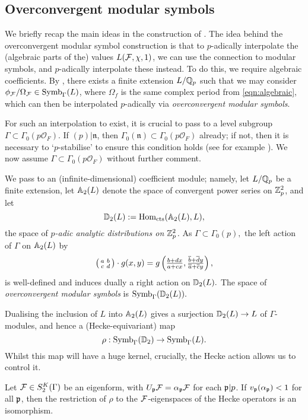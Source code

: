 \documentclass[a4paper,11pt]{article}
\newcommand{\cO}{\mathcal{O}}
\numberwithin{equation}{section}
\newcommand{\fn}{\mathfrak{n}}
\begin{document}
\subsection{Overconvergent modular symbols}


We briefly recap the main ideas in the construction of \cite{Wil17}. The idea behind the overconvergent modular symbol construction  is that to $p$-adically interpolate the (algebraic parts of the) values $L(\mathcal{F},\chi,1)$, we can use the connection to modular symbols, and $p$-adically interpolate these instead. To do this, we require algebraic coefficients. By \cite[\S8]{Hid94}, there exists a finite extension $L/\mathbb{Q}_p$ such that we may consider $\phi_{\mathcal{F}}/\Omega_{\mathcal{F}} \in \mathrm{Symb}_{\Gamma}(L)$, where $\Omega_f$ is the same complex period from \eqref{eqn:algebraic}, which can then be interpolated $p$-adically via \emph{overconvergent modular symbols}.

For such an interpolation to exist, it is crucial to pass to a level subgroup $\Gamma \subset \Gamma_0(p\cO_F).$ If $(p)|\fn$, then $\Gamma_0(\fn) \subset \Gamma_0(p\cO_F)$ already; if not, then it is necessary to `$p$-stabilise' to ensure this condition holds (see for example \cite[\S2.4]{BW18}). We now assume $\Gamma \subset \Gamma_0(p\cO_F)$ without further comment.

We pass to an (infinite-dimensional) coefficient module; namely, let $L/\mathbb{Q}_p$ be a finite extension, let $\mathbb{A}_2(L)$ denote the space of convergent power series on $\mathbb{Z}_p^2$, and let
\[
    \mathbb{D}_2(L) := \mathrm{Hom}_{\mathrm{cts}}(\mathbb{A}_2(L),L),
\]
the space of \emph{$p$-adic analytic distributions on $\mathbb{Z}_p^2$.} As $\Gamma \subset \Gamma_0(p),$ the left action of $\Gamma$ on $\mathbb{A}_2(L)$ by
\[
    \left(\begin{smallmatrix}a & b\\c & d\end{smallmatrix}\right) \cdot g(x,y) = g\left(\tfrac{b+dx}{a+cx}, \tfrac{\overline{b} + \overline{d}y}{\overline{a}+\overline{c}y}\right),
\]
is well-defined and induces dually a right action on $\mathbb{D}_2(L).$ The space of \emph{overconvergent modular symbols} is $\mathrm{Symb}_{\Gamma}(\mathbb{D}_2(L)).$

Dualising the inclusion of $L$ into $\mathbb{A}_2(L)$ gives a surjection $\mathbb{D}_2(L) \rightarrow L$ of $\Gamma$-modules, and hence a (Hecke-equivariant) map
\[
    \rho : \mathrm{Symb}_\Gamma(\mathbb{D}_2) \rightarrow \mathrm{Symb}_\Gamma(L).
\]
Whilst this map will have a huge kernel, crucially, the Hecke action allows us to control it.

\begin{theorem}\emph{\cite[Thm.~6.10]{Wil17}} \label{thm:control theorem}
Let $\mathcal{F} \in S_2^K(\Gamma)$ be an eigenform, with $U_{\mathfrak{p}}\mathcal{F} = \alpha_{\mathfrak{p}}\mathcal{F}$ for each $\mathfrak{p}|p$. If $v_{\mathfrak{p}}(\alpha_{\mathfrak{p}}) < 1$ for all $\mathfrak{p}$, then the restriction of $\rho$ to the $\mathcal{F}$-eigenspaces of the Hecke operators is an isomorphism.
\end{theorem}
\end{document}
